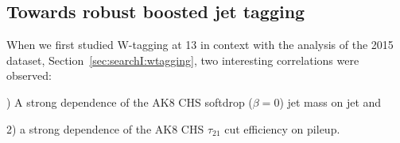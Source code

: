 \newcommand{\SFWTAGHPWPT} {$1.03 \pm 0.03~\rm{(stat)} \pm 0.04~\rm{(sys)} \pm 0.06~\rm{(sys)}$}
\newcommand{\SFWTAGLPWPT} {$0.88 \pm 0.12~\rm{(stat)} \pm 0.17~\rm{(sys)} \pm 0.12~\rm{(sys)}$}
\newcommand{\SFWTAGHPWPL} {\ensuremath{1.01\pm0.03}\xspace}
\newcommand{\SFWTAGLPWPL} {\ensuremath{0.78\pm0.87}\xspace}
\newcommand{\UNCWTAGHPWPT} {\ensuremath{13\%}\xspace} 
\newcommand{\UNCWTAGLPWPT} {\ensuremath{56\%}\xspace}
\newcommand{\UNCWTAGHPWPL} {\ensuremath{10\%}\xspace}
\newcommand{\UNCWTAGLPWPL} {\ensuremath{26\%}\xspace}
\newcommand{\WMASSDATAWPT}{\ensuremath{81.9\pm0.3}\xspace}
\newcommand{\WRESDATAWPT} {\ensuremath{8.9\pm0.4}\xspace}
\newcommand{\WMASSMCWPT}  {\ensuremath{82.0\pm0.2}\xspace}
\newcommand{\WRESMCWPT}   {\ensuremath{8.3\pm0.3}\xspace}
\newcommand{\JMS}         {$0.999 \pm 0.004~\rm{(stat)} \pm 0.0006~\rm{(sys)}$}
\newcommand{\JMR}         {$1.08 \pm 0.07~\rm{(stat)} \pm 0.08~\rm{(sys)}$}
\subsection{Towards robust boosted jet tagging}
\label{sec:searchII:intro}
When we first studied W-tagging at 13 \TeV in context with the analysis of the 2015 dataset, Section~\ref{sec:searchI:wtagging}, two interesting correlations were observed:

) A strong dependence of the AK8 CHS softdrop ($\beta = 0$) jet mass on jet \PT and

2) a strong dependence of the AK8 CHS $\tau_{21}$ cut efficiency on pileup.
\bigskip

